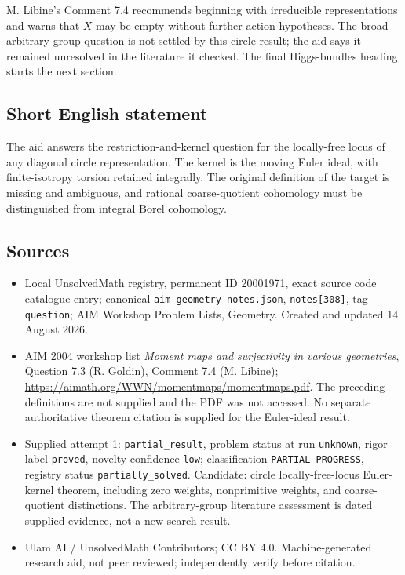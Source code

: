 \documentclass[11pt]{article}
\begin{document}
M. Libine's Comment 7.4 recommends beginning with irreducible representations and warns that \(X\) may be empty without further action hypotheses. The broad arbitrary-group question is not settled by this circle result; the aid says it remained unresolved in the literature it checked. The final Higgs-bundles heading starts the next section.
\subsection{Short English statement}
The aid answers the restriction-and-kernel question for the locally-free locus of any diagonal circle representation. The kernel is the moving Euler ideal, with finite-isotropy torsion retained integrally. The original definition of the target is missing and ambiguous, and rational coarse-quotient cohomology must be distinguished from integral Borel cohomology.
\subsection{Sources}
\begin{itemize}
\item Local UnsolvedMath registry, permanent ID 20001971, exact source code catalogue entry; canonical \texttt{aim-geometry-notes.json}, \texttt{notes[308]}, tag \texttt{question}; AIM Workshop Problem Lists, Geometry. Created and updated 14 August 2026.
\item AIM 2004 workshop list \emph{Moment maps and surjectivity in various geometries}, Question 7.3 (R. Goldin), Comment 7.4 (M. Libine); \url{https://aimath.org/WWN/momentmaps/momentmaps.pdf}. The preceding definitions are not supplied and the PDF was not accessed. No separate authoritative theorem citation is supplied for the Euler-ideal result.
\item Supplied attempt 1: \texttt{partial\_result}, problem status at run \texttt{unknown}, rigor label \texttt{proved}, novelty confidence \texttt{low}; classification \texttt{PARTIAL-PROGRESS}, registry status \texttt{partially\_solved}. Candidate: circle locally-free-locus Euler-kernel theorem, including zero weights, nonprimitive weights, and coarse-quotient distinctions. The arbitrary-group literature assessment is dated supplied evidence, not a new search result.
\item Ulam AI / UnsolvedMath Contributors; CC BY 4.0. Machine-generated research aid, not peer reviewed; independently verify before citation.
\end{itemize}
\end{document}
